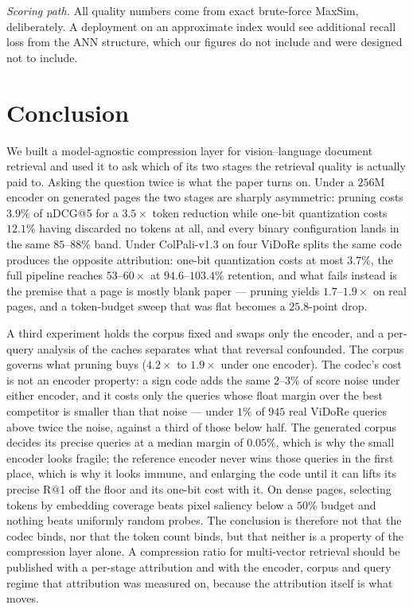 \documentclass[conference]{IEEEtran}
\begin{document}
\emph{Scoring path.} All quality numbers come from exact brute-force MaxSim,
deliberately. A deployment on an approximate index would see additional recall
loss from the ANN structure, which our figures do not include and were designed
not to include.

\section{Conclusion}

We built a model-agnostic compression layer for vision--language document
retrieval and used it to ask which of its two stages the retrieval quality is
actually paid to. Asking the question twice is what the paper turns on. Under a
$256$M encoder on generated pages the two stages are sharply asymmetric: pruning
costs $3.9\%$ of nDCG@5 for a $3.5\times$ token reduction while one-bit
quantization costs $12.1\%$ having discarded no tokens at all, and every binary
configuration lands in the same $85$--$88\%$ band. Under ColPali-v1.3 on four
ViDoRe splits the same code produces the opposite attribution: one-bit
quantization costs at most $3.7\%$, the full pipeline reaches $53$--$60\times$ at
$94.6$--$103.4\%$ retention, and what fails instead is the premise that a page is
mostly blank paper --- pruning yields $1.7$--$1.9\times$ on real pages, and a
token-budget sweep that was flat becomes a $25.8$-point drop.

A third experiment holds the corpus fixed and swaps only the encoder, and a
per-query analysis of the caches separates what that reversal confounded. The
corpus governs what pruning buys ($4.2\times$ to $1.9\times$ under one encoder).
The codec's cost is not an encoder property: a sign code adds the same
$2$--$3\%$ of score noise under either encoder, and it costs only the queries
whose float margin over the best competitor is smaller than that noise ---
under $1\%$ of $945$ real ViDoRe queries above twice the noise, against a third
of those below half. The generated corpus decides its precise
queries at a median margin of $0.05\%$, which is why the small encoder looks
fragile; the reference encoder never wins those queries in the first place,
which is why it looks immune, and enlarging the code until it can lifts its
precise R@1 off the floor and its one-bit cost with it. On dense pages,
selecting tokens by embedding coverage beats pixel saliency below a $50\%$
budget and nothing beats uniformly random probes. The conclusion is therefore
not that the codec binds, nor that the token count binds, but that neither is a
property of the compression layer alone. A compression ratio for multi-vector
retrieval should be published with a per-stage attribution and with the
encoder, corpus and query regime that attribution was measured on, because the
attribution itself is what moves.
\end{document}
